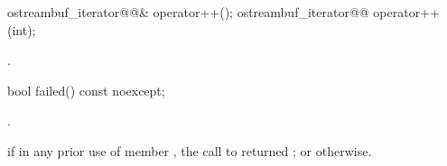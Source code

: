 %
\begin{itemdecl}
ostreambuf_iterator@@& operator++();
ostreambuf_iterator@@ operator++(int);
\end{itemdecl}

\begin{itemdescr}
\pnum
\returns
{}.
\end{itemdescr}

%
\begin{itemdecl}
bool failed() const noexcept;
\end{itemdecl}

\begin{itemdescr}
\begin{addedblock}
\pnum
\requires {}.
\end{addedblock}

\pnum
\returns
{}
if in any prior use of member
,
the call to
returned
;
or
otherwise.
\end{itemdescr}

